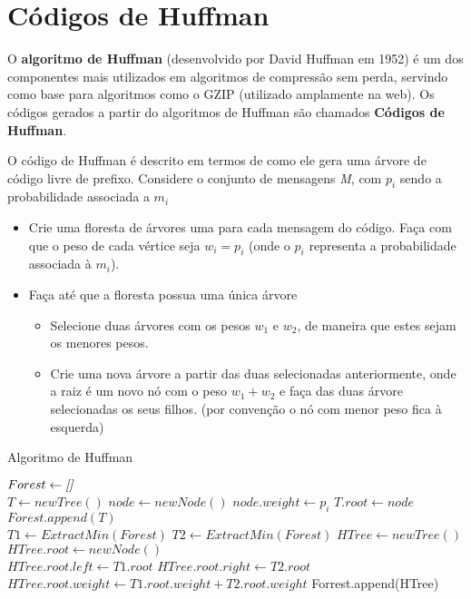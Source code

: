 \section{Códigos de Huffman}
O \textbf{algoritmo de Huffman} (desenvolvido por David Huffman em 1952) é um dos componentes mais utilizados em algoritmos de compressão sem perda, servindo como base para algoritmos como o GZIP (utilizado amplamente na web).
Os códigos gerados a partir do algoritmos de Huffman são chamados \textbf{Códigos de Huffman}.

O código de Huffman é descrito em termos de como ele gera uma árvore de código livre de prefixo. Considere o conjunto de mensagens \emph{M}, com $p_i$ sendo a probabilidade associada a $m_i$

\begin{itemize}
	\item Crie uma floresta de árvores uma para cada mensagem do código. Faça com que o peso de cada vértice seja $w_i = p_i$ (onde o $p_i$ representa a probabilidade associada à $m_i$).
	\item Faça até que a floresta possua uma única árvore
	\begin{itemize}
		\item Selecione duas árvores com os pesos $w_1$ e $w_2$, de maneira que estes sejam os menores pesos.
		\item Crie uma nova árvore a partir das duas selecionadas anteriormente, onde a raiz é um novo nó com o peso $w_1 + w_2$ e faça das duas árvore selecionadas os seus filhos. (por convenção o nó com menor peso fica à esquerda)
	\end{itemize}
\end{itemize}

\begin{algorithm}
\caption{Algoritmo de Huffman} \label{alg:huff}
\begin{algorithmic}
	\State $Forest \gets \emph{[]}$\\
	 
		\State $T \gets newTree()$
		\State $node \gets newNode()$
		\State $node.weight \gets p_i$ 
		\State $T.root \gets node$
		\State $Forest.append(T)$
	\EndFor \\
	
		\State $T1 \gets ExtractMin(Forest)$ 
		\State $T2 \gets ExtractMin(Forest)$
		\State $HTree \gets newTree()$
		\State $HTree.root \gets newNode()$ \\
		\State $HTree.root.left \gets T1.root$
		\State $HTree.root.right \gets T2.root$
		\State $HTree.root.weight \gets T1.root.weight + T2.root.weight$
		\State Forrest.append(HTree) 
	\EndWhile
	
\end{algorithmic}
\end{algorithm}

